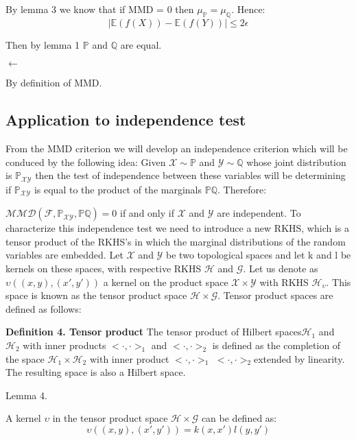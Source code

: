 \documentclass[8pt,a4paper]{article}
\providecommand{\abs}[1]{\lvert#1\rvert}
\begin{document}
By lemma 3 we know that if MMD = 0 then $\mu_{\mathbb{P}} = \mu_{\mathbb{Q}}$. Hence:
$$\abs{\mathbb{E}(f(X)) - \mathbb{E}(f(Y))} \leq 2\epsilon$$

Then by lemma 1 $\mathbb{P}$ and $\mathbb{Q}$  are equal.

\begin{flushleft}
$\leftarrow$
\end{flushleft}
By definition of MMD.

\subsection{Application to independence test}

From the MMD criterion we will develop an independence criterion which will be conduced by the following idea:
Given $\mathcal{X} \sim \mathbb{P}$ and $\mathcal{Y} \sim \mathbb{Q}$ whose joint distribution is $\mathbb{P}_{\mathcal{XY}}$ then the test of independence between these variables will be determining if $\mathbb{P}_{\mathcal{XY}}$ is equal to the product of the marginals $\mathbb{P}\mathbb{Q}$. Therefore:

$\mathcal{MMD}(\mathcal{F}, \mathbb{P}_{\mathcal{XY}},\mathbb{P}\mathbb{Q}) = 0$ if and only if $\mathcal{X}$ and $\mathcal{Y}$ are independent.
To characterize this independence test we need to introduce a new RKHS, which is a tensor product of the RKHS’s in which the marginal distributions of the random variables are embedded. Let $\mathcal{X}$ and $\mathcal{Y}$ be two topological spaces and let k and l be kernels on these spaces, with respective RKHS $\mathcal{H}$ and $\mathcal{G}$. Let us denote as $\upsilon((x, y), (x' , y ' ))$ a kernel on the product space $\mathcal{X}\times\mathcal{Y}$ with RKHS $\mathcal{H}_{\upsilon}$. This space is known as the tensor product space $\mathcal{H}\times\mathcal{G}$. Tensor product spaces are defined as follows:

\textsf{\textbf{Definition 4. Tensor product}}
The tensor product of Hilbert spaces$\mathcal{H}_{1}$ and $\mathcal{H}_{2}$  with inner products $<·, ·>_{1}$ and
$<·, ·>_{2}$ is defined as the completion of the space $\mathcal{H}_{1}\times\mathcal{H}_{2}$  with inner product  $<·, ·>_{1}$ $<·, ·>_{2}$extended
by linearity. The resulting space is also a Hilbert space.

\textsf{Lemma 4.} 

A kernel $\upsilon$ in the tensor product space  $\mathcal{H}\times\mathcal{G}$ can be defined as:
$$\upsilon((x,y),(x',y')) = k(x,x')l(y,y')$$
\end{document}
